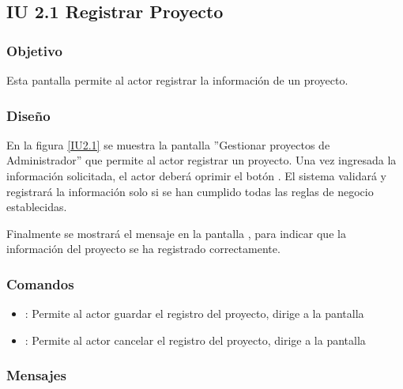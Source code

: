 \subsection{IU 2.1 Registrar Proyecto}

\subsubsection{Objetivo}
	Esta pantalla permite al actor registrar la información de un proyecto.
\subsubsection{Diseño}
	En la figura \ref{IU2.1} se muestra la pantalla ''Gestionar proyectos de Administrador'' que permite al actor registrar un proyecto.
	Una vez ingresada la información solicitada, el actor deberá oprimir el botón  . El sistema validará y registrará la información solo si se han cumplido todas las reglas de negocio establecidas.
	
	Finalmente se mostrará el mensaje  en la pantalla , para indicar que la información del proyecto se ha registrado correctamente.

 \label{IU2.1}
\subsubsection{Comandos}
\begin{itemize}
	\item {}: Permite al actor guardar el registro del proyecto, dirige a la pantalla 
	\item {}: Permite al actor cancelar el registro del proyecto, dirige a la pantalla 
\end{itemize}

\subsubsection{Mensajes}

